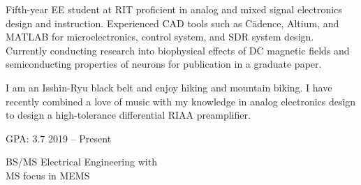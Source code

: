 \documentclass{cv}  %
\begin{document}
\begin{paracol}{2}


\RaggedRight
Fifth-year EE student at RIT proficient in analog and mixed signal electronics design and instruction. Experienced CAD tools such as C\=adence, Altium, and MATLAB for microelectronics, control system, and SDR system design. Currently conducting research into biophysical effects of DC magnetic fields and semiconducting properties of neurons for publication in a graduate paper.

I am an Isshin-Ryu black belt and enjoy hiking and mountain biking. I have recently combined a love of music with my knowledge in analog electronics design to design a high-tolerance differential RIAA preamplifier.

\vspace{-4pt}
{\large{}} \par\smallskip
\vspace{-8pt}
{GPA: 3.7} \hfill 2019 -- Present \par\vspace{-4pt}
BS/MS Electrical Engineering with \\
MS focus in MEMS\\

\vspace{12pt}




\end{paracol}
\end{document}

